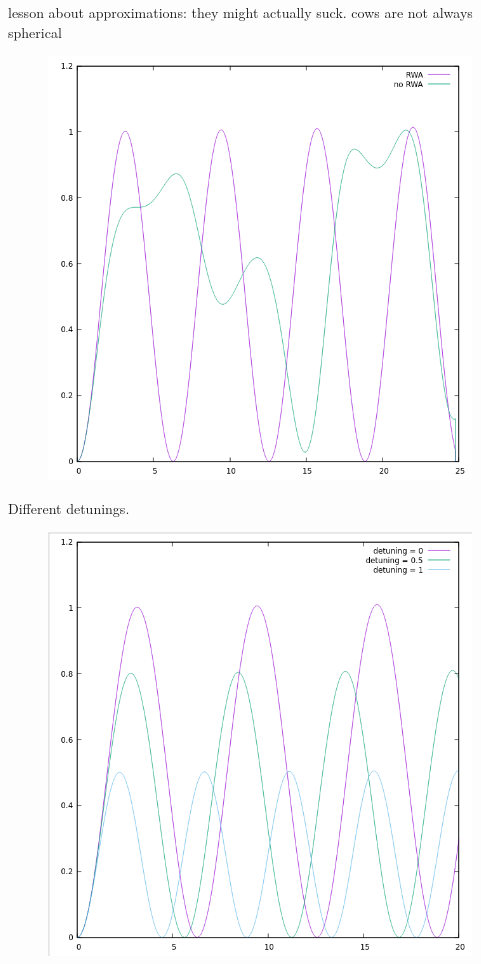 \documentclass{beamer}
\begin{document}
\begin{frame}
lesson about approximations: they might actually suck. cows are not always spherical
\begin{figure}
\includegraphics[scale=0.45]{rvsnr.png}
\end{figure}

\end{frame}
\begin{frame}
Different detunings.
\begin{figure}
\includegraphics[scale=0.45]{detunings.png}
\end{figure}

\end{frame}
\end{document}
